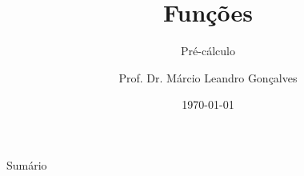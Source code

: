 \documentclass[14pt, aspectratio=169]{beamer}
\title{Funções}
\subtitle{Pré-cálculo}
\author{Prof. Dr. Márcio Leandro Gonçalves}
\date{\today}
\institute{PUC Minas - Poços de Caldas}
\begin{document}
\begin{frame}
\maketitle 
\end{frame}

\begin{frame}{Sumário}
    \begin{multicols}{2}
        \tableofcontents
    \end{multicols}
\end{frame}












\end{document}
